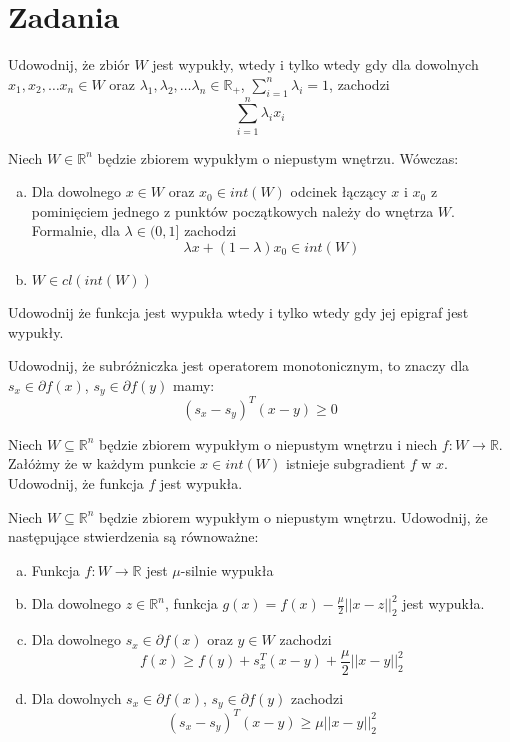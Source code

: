 \documentclass[10pt,a4paper,draft]{report}
\begin{document}
\section{Zadania}
\begin{problem}
Udowodnij, że zbiór $W$ jest wypukły, wtedy i tylko wtedy gdy dla dowolnych $x_1, x_2, \ldots x_n \in W$ oraz $\lambda_1, \lambda_2, \ldots \lambda_n \in \mathbb{R}_+$, $\sum_{i=1}^n \lambda_i = 1$, zachodzi
\[
\sum_{i=1}^n \lambda_i x_i
\]
\end{problem}
\begin{problem}
Niech $W \in \mathbb{R}^n$ będzie zbiorem wypukłym o niepustym wnętrzu. Wówczas:
\begin{enumerate}[a)]

\item Dla dowolnego $x \in W$ oraz $x_0 \in int(W)$ odcinek łączący $x$ i $x_0$ z pominięciem jednego z punktów początkowych należy do wnętrza $W$. Formalnie, dla $\lambda \in (0, 1]$ zachodzi
\[
\lambda x + (1 - \lambda) x_0 \in int(W)
\]

\item $W \in cl(int(W))$
\end{enumerate}
\end{problem}
\begin{problem}
Udowodnij że funkcja jest wypukła wtedy i tylko wtedy gdy jej epigraf jest wypukły.
\end{problem}

\begin{problem}
Udowodnij, że subróżniczka jest operatorem monotonicznym, to znaczy dla $s_x \in \partial f(x)$, $s_y \in \partial f(y)$ mamy:
\[
(s_x - s_y)^T (x - y) \geq 0
\]
\end{problem}

\begin{problem}
Niech $W \subseteq \mathbb{R}^n$ będzie zbiorem wypukłym o niepustym wnętrzu i niech $f : W \rightarrow \mathbb{R}$. Załóżmy że w każdym punkcie $x \in int(W)$ istnieje subgradient $f$ w $x$. Udowodnij, że funkcja $f$ jest wypukła.
\end{problem}

\begin{problem}
Niech $W \subseteq \mathbb{R}^n$ będzie zbiorem wypukłym o niepustym wnętrzu. Udowodnij, że następujące stwierdzenia są równoważne:
\begin{enumerate}[a)]
\item Funkcja $f: W \rightarrow \mathbb{R}$ jest $\mu$-silnie wypukła
\item Dla dowolnego $z \in \mathbb{R}^n$, funkcja $g(x) = f(x) - \frac{\mu}{2}||x-z||_2^2$ jest wypukła.
\item Dla dowolnego $s_x \in \partial f(x)$ oraz $y \in W$ zachodzi
\[
f(x) \geq f(y) + s_x^T(x - y) + \frac{\mu}{2} ||x-y||_2^2
\]
\item Dla dowolnych $s_x \in \partial f(x)$, $s_y \in \partial f(y)$ zachodzi
\[
(s_x - s_y)^T (x - y) \geq \mu ||x-y||_2^2
\]
\end{enumerate}
\end{problem}
\end{document}
